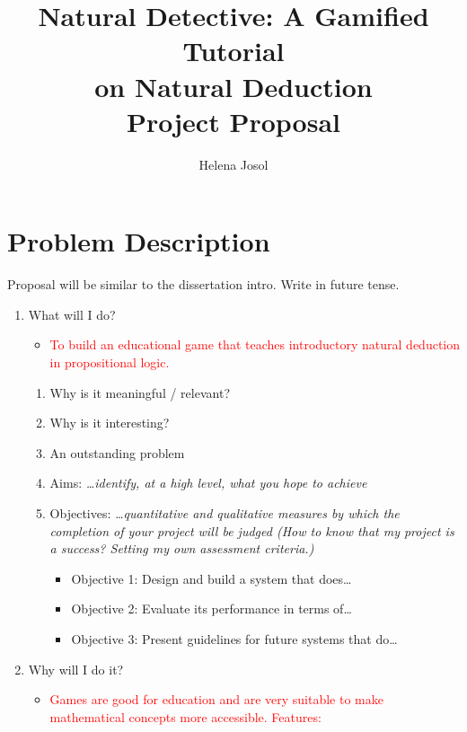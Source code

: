 \documentclass[a4paper,11pt]{article}
\title{Natural Detective: A Gamified Tutorial \\ on Natural Deduction \\ \medskip \Large{Project Proposal}}
\author{Helena Josol}
\date{}
\newcommand{\draft}[1]{\textcolor{red}{#1}}
\begin{document}
\maketitle


\section{Problem Description} %
Proposal will be similar to the dissertation intro. Write in future tense.
\begin{enumerate}
  \item What will I do?
    \begin{itemize}
      \item \draft{To build an educational game that teaches introductory natural deduction in propositional logic.}
    \end{itemize}
    \begin{enumerate}
      \item Why is it meaningful / relevant?
      \item Why is it interesting?
      \item An outstanding problem
      \item Aims: \textit{\dots identify, at a high level, what you hope to achieve}
      \item Objectives: \textit{\dots quantitative and qualitative measures by which the completion of your project will be judged (How to know that my project is a success? Setting my own assessment criteria.)}
        \begin{itemize}
          \item Objective 1: Design and build a system that does\dots
          \item Objective 2: Evaluate its performance in terms of\dots
          \item Objective 3: Present guidelines for future systems that do\dots
        \end{itemize}
    \end{enumerate}
  \item Why will I do it?
    \begin{itemize}
      \item \draft{Games are good for education and are very suitable to make mathematical concepts more accessible. Features:}
      \begin{itemize}

\end{itemize}
\end{itemize}
\end{enumerate}
\end{document}
